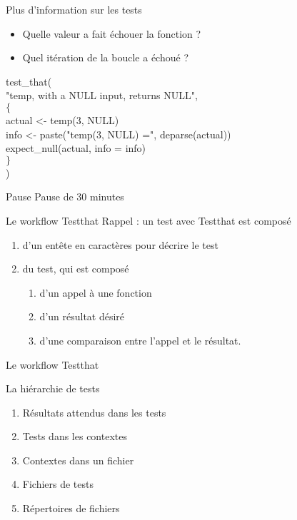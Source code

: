 \documentclass[11pt]{beamer}
\begin{document}
\begin{frame}{Plus d'information sur les tests}
\begin{itemize}
\item Quelle valeur a fait échouer la fonction ?
\item Quel itération de la boucle a échoué ?
\end{itemize}
{\ttfamily 

test\_that(\\
\quad"temp, with a NULL input, returns NULL",\\
\quad$\{$\\
\qquad	actual <- temp(3, NULL)\\
\qquad	info <- paste("temp(3, NULL) =", deparse(actual))\\
\qquad	expect\_null(actual, info = info)\\
\quad$\}$\\
)
}
\end{frame}

\begin{frame}{Pause}
Pause de 30 minutes
\end{frame}

\begin{frame}{Le workflow Testthat}
Rappel : un test avec Testthat est composé

\begin{enumerate}
\item d'un entête en caractères pour décrire le test
\item du test, qui est composé
\begin{enumerate}
\item d'un appel à une fonction
\item d'un résultat désiré
\item d'une comparaison entre l'appel et le résultat. 
\end{enumerate}
\end{enumerate}
\end{frame}

\begin{frame}{Le workflow Testthat}

La hiérarchie de tests

\begin{enumerate}
\item Résultats attendus dans les tests
\item Tests dans les contextes
\item Contextes dans un fichier
\item Fichiers de tests
\item Répertoires de fichiers
\end{enumerate}

\end{frame}
\end{document}
